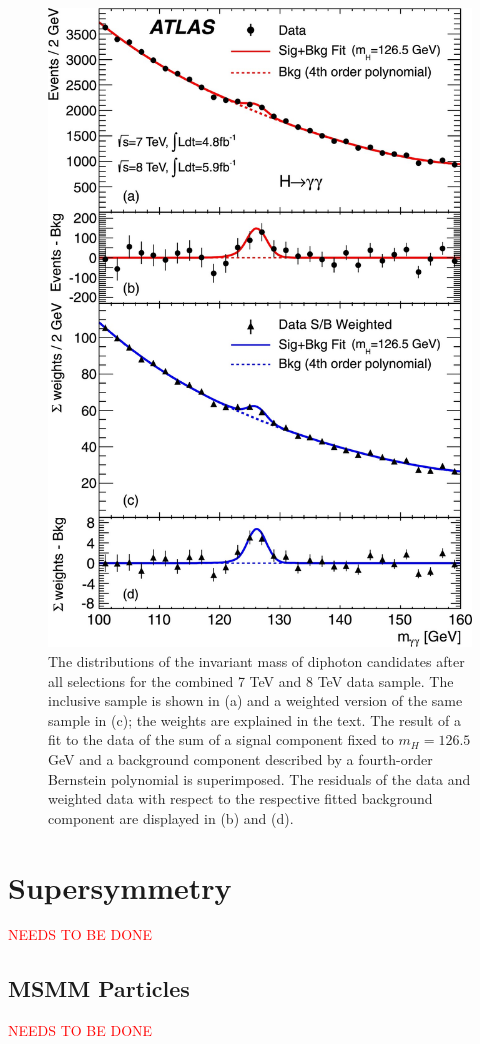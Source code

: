 		\begin{figure}[!ht]
		\centering
		\includegraphics[width=.7\textwidth,keepaspectratio=true]{chapters/chapter1_theory/images/Higgs_Discovery_gam_gam.jpeg}
		\caption{The distributions of the invariant mass of diphoton candidates after all selections for the combined 7 TeV and 8 TeV data sample. The inclusive sample is shown in (a) and a weighted version of the same sample in (c); the weights are explained in the text. The result of a fit to the data of the sum of a signal component fixed to $m_H=126.5$ GeV  and a background component described by a fourth-order Bernstein polynomial is superimposed. The residuals of the data and weighted data with respect to the respective fitted background component are displayed in (b) and (d).}
		\label{fig:higgs-discovery}
		\end{figure}

\section{Supersymmetry}\label{sec:SUSY}
	\textcolor{red}{NEEDS TO BE DONE}

	\subsection{MSMM Particles}\label{ssec:MSMM}
		\textcolor{red}{NEEDS TO BE DONE}

